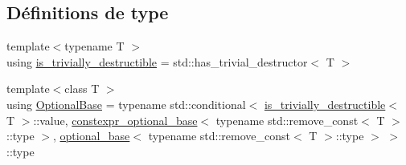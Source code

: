 \subsection*{Définitions de type}
\begin{DoxyCompactItemize}
\item 
{\footnotesize template$<$typename T $>$ }\\using \hyperlink{namespacestd_1_1experimental_a481cc29b2f00961d0afc189e6e90f739}{is\+\_\+trivially\+\_\+destructible} = std\+::has\+\_\+trivial\+\_\+destructor$<$ T $>$
\item 
{\footnotesize template$<$class T $>$ }\\using \hyperlink{namespacestd_1_1experimental_a33aa5e258a2b0762197365c1ef3f90aa}{Optional\+Base} = typename std\+::conditional$<$ \hyperlink{namespacestd_1_1experimental_a481cc29b2f00961d0afc189e6e90f739}{is\+\_\+trivially\+\_\+destructible}$<$ T $>$\+::value, \hyperlink{structstd_1_1experimental_1_1constexpr__optional__base}{constexpr\+\_\+optional\+\_\+base}$<$ typename std\+::remove\+\_\+const$<$ T $>$\+::type $>$, \hyperlink{structstd_1_1experimental_1_1optional__base}{optional\+\_\+base}$<$ typename std\+::remove\+\_\+const$<$ T $>$\+::type $>$ $>$\+::type
\end{DoxyCompactItemize}
